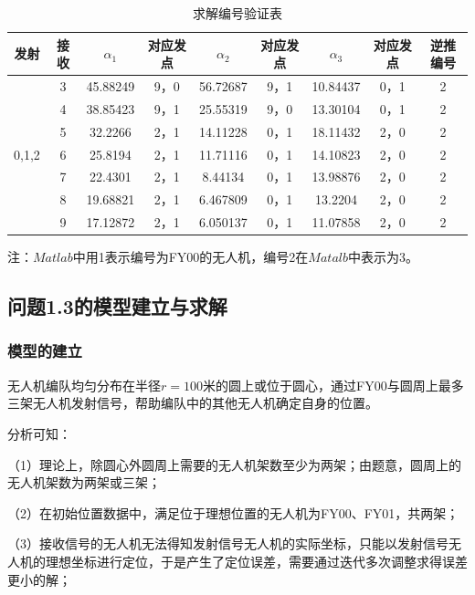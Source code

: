 \documentclass[12pt]{ctexart}
\begin{document}
\begin{spacing}{1.5}
\begin{table}[H]
	\centering
	\caption{求解编号验证表}
	\begin{tabular}{ccccccccc}
		\toprule[1.5pt]
		发射   & 接收 & $\alpha_1$   & 对应发点 & $\alpha_2$   & 对应发点 & $\alpha_3$    & 对应发点 & 逆推编号 \\ 
		\midrule[1pt]
		\multirow{7}{*}{0,1,2} & 3     & 45.88249 & 9，0   & 56.72687 & 9，1   & 10.84437 & 0，1   & 2                      \\ \cline{2-9} 
		& 4     & 38.85423 & 9，1   & 25.55319 & 9，0   & 13.30104 & 0，1   & 2                      \\ \cline{2-9} 
		& 5     & 32.2266  & 2，1   & 14.11228 & 0，1   & 18.11432 & 2，0   & 2                      \\ \cline{2-9} 
		& 6     & 25.8194  & 2，1   & 11.71116 & 0，1   & 14.10823 & 2，0   & 2                      \\ \cline{2-9} 
		& 7     & 22.4301  & 2，1   & 8.44134  & 0，1   & 13.98876 & 2，0   & 2                      \\ \cline{2-9} 
		& 8     & 19.68821 & 2，1   & 6.467809 & 0，1   & 13.2204  & 2，0   & 2                      \\ \cline{2-9} 
		& 9     & 17.12872 & 2，1   & 6.050137 & 0，1   & 11.07858 & 2，0   & 2                      \\ 
		\bottomrule[1.5pt]
	\end{tabular}
\end{table}

注：$Matlab$中用1表示编号为FY00的无人机，编号2在$Matalb$中表示为3。

\subsection{问题1.3的模型建立与求解}
\subsubsection{模型的建立}
无人机编队均匀分布在半径$r=100$米的圆上或位于圆心，通过FY00与圆周上最多三架无人机发射信号，帮助编队中的其他无人机确定自身的位置。

分析可知：

（1）理论上，除圆心外圆周上需要的无人机架数至少为两架；由题意，圆周上的无人机架数为两架或三架；

（2）在初始位置数据中，满足位于理想位置的无人机为FY00、FY01，共两架；

（3）接收信号的无人机无法得知发射信号无人机的实际坐标，只能以发射信号无人机的理想坐标进行定位，于是产生了定位误差，需要通过迭代多次调整求得误差更小的解；


\end{spacing}
\end{document}
